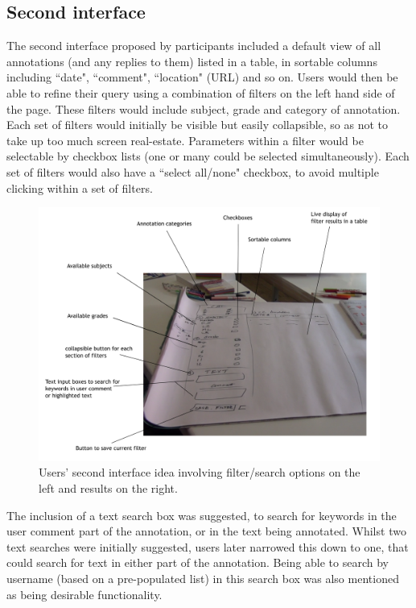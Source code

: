 \subsection{Second interface}
The second interface proposed by participants included a default view of all annotations (and any replies to them) listed in a table, in sortable columns including ``date", ``comment", ``location" (URL) and so on. Users would then be able to refine their query using a combination of filters on the left hand side of the page. These filters would include subject, grade and category of annotation. Each set of filters would initially be visible but easily collapsible, so as not to take up too much screen real-estate. Parameters within a filter would be selectable by checkbox lists (one or many could be selected simultaneously). Each set of filters would also have a ``select all/none" checkbox, to avoid multiple clicking within a set of filters.
\begin{figure}[h!]
    \centering
    \includegraphics[width=\textwidth]{Figures/PD1shot4labels.png}
 \caption{Users' second interface idea involving filter/search options on the left and results on the right.}
\end{figure}

The inclusion of a text search box was suggested, to search for keywords in the user comment part of the annotation, or in the text being annotated. Whilst two text searches were initially suggested, users later narrowed this down to one, that could search for text in either part of the annotation. Being able to search by username (based on a pre-populated list) in this search box was also mentioned as being desirable functionality. 

